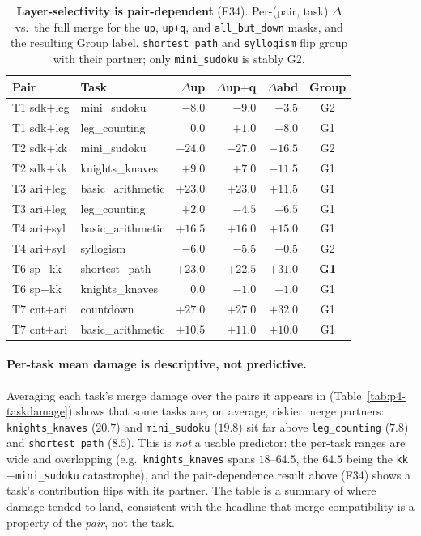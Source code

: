 \documentclass{article}
\begin{document}
\begin{table}[h]
\centering\small
\caption{\textbf{Layer-selectivity is pair-dependent} (F34). Per-(pair, task) $\Delta$ vs.\ the
full merge for the \texttt{up}, \texttt{up+q}, and \texttt{all\_but\_down} masks, and the
resulting Group label. \texttt{shortest\_path} and \texttt{syllogism} flip group with their
partner; only \texttt{mini\_sudoku} is stably G2.}
\begin{tabular}{llrrrc}
\toprule
Pair & Task & $\Delta$up & $\Delta$up$+$q & $\Delta$abd & Group\\
\midrule
T1 sdk$+$leg & mini\_sudoku    & $-8.0$  & $-9.0$  & $+3.5$  & G2\\
T1 sdk$+$leg & leg\_counting   & $0.0$   & $+1.0$  & $-8.0$  & G1\\
T2 sdk$+$kk  & mini\_sudoku    & $-24.0$ & $-27.0$ & $-16.5$ & G2\\
T2 sdk$+$kk  & knights\_knaves & $+9.0$  & $+7.0$  & $-11.5$ & G1\\
T3 ari$+$leg & basic\_arithmetic & $+23.0$ & $+23.0$ & $+11.5$ & G1\\
T3 ari$+$leg & leg\_counting   & $+2.0$  & $-4.5$  & $+6.5$  & G1\\
T4 ari$+$syl & basic\_arithmetic & $+16.5$ & $+16.0$ & $+15.0$ & G1\\
T4 ari$+$syl & syllogism       & $-6.0$  & $-5.5$  & $+0.5$  & G2\\
T6 sp$+$kk   & shortest\_path  & $+23.0$ & $+22.5$ & $+31.0$ & \textbf{G1}\\
T6 sp$+$kk   & knights\_knaves & $0.0$   & $-1.0$  & $+1.0$  & G1\\
T7 cnt$+$ari & countdown       & $+27.0$ & $+27.0$ & $+32.0$ & G1\\
T7 cnt$+$ari & basic\_arithmetic & $+10.5$ & $+11.0$ & $+10.0$ & G1\\
\bottomrule
\end{tabular}
\end{table}

\paragraph{Per-task mean damage is descriptive, not predictive.} Averaging each task's merge
damage over the pairs it appears in (Table~\ref{tab:p4-taskdamage}) shows that some tasks are, on
average, riskier merge partners: \texttt{knights\_knaves} ($20.7$) and \texttt{mini\_sudoku}
($19.8$) sit far above \texttt{leg\_counting} ($7.8$) and \texttt{shortest\_path} ($8.5$). This is
\emph{not} a usable predictor: the per-task ranges are wide and overlapping (e.g.\
\texttt{knights\_knaves} spans $18$--$64.5$, the $64.5$ being the \texttt{kk}$+$\texttt{mini\_sudoku}
catastrophe), and the pair-dependence result above (F34) shows a task's contribution flips with its
partner. The table is a summary of where damage tended to land, consistent with the headline that
merge compatibility is a property of the \emph{pair}, not the task.
\end{document}
